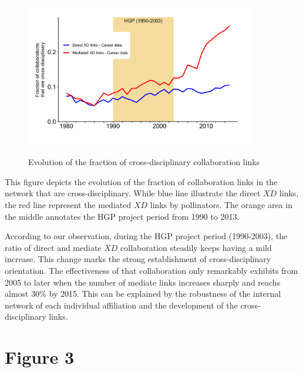 \documentclass[10pt]{article}         %
\begin{document}
\newpage
\begin{figure}[!htb]
  \centering
  \includegraphics[width=10cm, height=7cm]{Fig2B.png}
  \caption{Evolution of the fraction of cross-disciplinary collaboration links}
  \label{fig:2B}
\end{figure}

This figure depicts the evolution of the fraction of collaboration links in the network that are cross-disciplinary. While blue line illustrate the direct $XD$ links, the red line represent the mediated $XD$ links by pollinators. The orange area in the middle annotates the HGP project period from 1990 to 2013.

According to our observation, during the HGP project period (1990-2003), the ratio of direct and mediate $XD$ collaboration steadily keeps having a mild increase. This change marks the strong establishment of cross-disciplinary orientation. The effectiveness of that collaboration only remarkably exhibits from 2005 to later when the number of mediate links increases sharply and reachs almost 30\% by 2015. This can be explained by the robustness of the internal network of each individual affiliation and the development of the cross-disciplinary links.

\newpage
\section{Figure 3}
\end{document}
